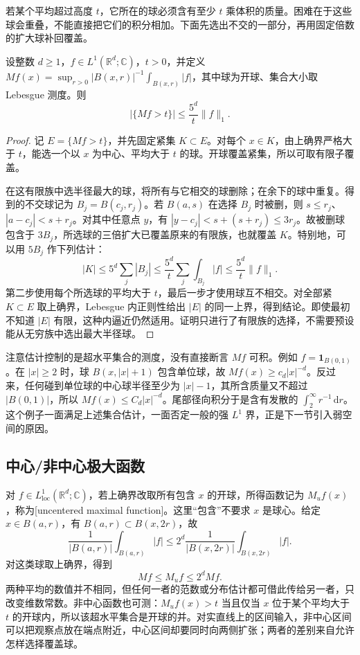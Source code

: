 \ProseParagraphBreak

若某个平均超过高度 \(t\)，它所在的球必须含有至少 \(t\) 乘体积的质量。困难在于这些球会重叠，不能直接把它们的积分相加。下面先选出不交的一部分，再用固定倍数的扩大球补回覆盖。

\begin{theorem}\label{b2:thm:17-maximal-weak}
设整数 \(d\geq1\)，\(f\in L^1(\mathbb R^d;\mathbb C)\)，\(t>0\)，并定义 \(Mf(x)=\sup_{r>0}|B(x,r)|^{-1}\int_{B(x,r)}|f|\)，其中球为开球、集合大小取 Lebesgue 测度。则
\[
 |\{Mf>t\}|\leq \dfrac{5^d}{t}\|f\|_1.
\]
\end{theorem}
\begin{proof}
记 \(E=\{Mf>t\}\)，并先固定紧集 \(K\subset E\)。对每个 \(x\in K\)，由上确界严格大于 \(t\)，能选一个以 \(x\) 为中心、平均大于 \(t\) 的球。开球覆盖紧集，所以可取有限子覆盖。

在这有限族中选半径最大的球，将所有与它相交的球删除；在余下的球中重复。得到的不交球记为 \(B_j=B(c_j,r_j)\)。若 \(B(a,s)\) 在选择 \(B_j\) 时被删，则 \(s\leq r_j\)、\(|a-c_j|<s+r_j\)。对其中任意点 \(y\)，有 \(|y-c_j|<s+(s+r_j)\leq3r_j\)。故被删球包含于 \(3B_j\)，所选球的三倍扩大已覆盖原来的有限族，也就覆盖 \(K\)。特别地，可以用 \(5B_j\) 作下列估计：
\[
 |K|\leq5^d\sum_j|B_j|\leq\dfrac{5^d}{t}\sum_j\int_{B_j}|f|\leq\dfrac{5^d}{t}\|f\|_1.
\]
第二步使用每个所选球的平均大于 \(t\)，最后一步才使用球互不相交。对全部紧 \(K\subset E\) 取上确界，Lebesgue 内正则性给出 \(|E|\) 的同一上界，得到结论。即使最初不知道 \(|E|\) 有限，这种内逼近仍然适用。证明只进行了有限族的选择，不需要预设能从无穷族中选出最大半径球。
\end{proof}
注意估计控制的是超水平集合的测度，没有直接断言 \(Mf\) 可积。例如 \(f=\mathbf1_{B(0,1)}\)。在 \(|x|\geq2\) 时，球 \(B(x,|x|+1)\) 包含单位球，故 \(Mf(x)\geq c_d|x|^{-d}\)。反过来，任何碰到单位球的中心球半径至少为 \(|x|-1\)，其所含质量又不超过 \(|B(0,1)|\)，所以 \(Mf(x)\leq C_d|x|^{-d}\)。尾部径向积分于是含有发散的 \(\int_2^\infty r^{-1}\,\mathrm dr\)。这个例子一面满足上述集合估计，一面否定一般的强 \(L^1\) 界，正是下一节引入弱空间的原因。

\subsection{中心/非中心极大函数}
\label{b2:subsec:170102}

对 \(f\in L^1_{\mathrm{loc}}(\mathbb R^d;\mathbb C)\)，若上确界改取所有包含 \(x\) 的开球，所得函数记为 \(M_u f(x)\)，称为[uncentered maximal function]。这里“包含”不要求 \(x\) 是球心。给定 \(x\in B(a,r)\)，有 \(B(a,r)\subset B(x,2r)\)，故
\[\frac1{|B(a,r)|}\int_{B(a,r)}|f|
 \leq2^d\frac1{|B(x,2r)|}\int_{B(x,2r)}|f|.\]
对这类球取上确界，得到
\[
 Mf\leq M_u f\leq2^d Mf.
\]
两种平均的数值并不相同，但任何一者的范数或分布估计都可借此传给另一者，只改变维数常数。非中心函数也可测：\(M_uf(x)>t\) 当且仅当 \(x\) 位于某个平均大于 \(t\) 的开球内，所以该超水平集合是开球的并。对实直线上的区间输入，非中心区间可以把观察点放在端点附近，中心区间却要同时向两侧扩张；两者的差别来自允许怎样选择覆盖球。

